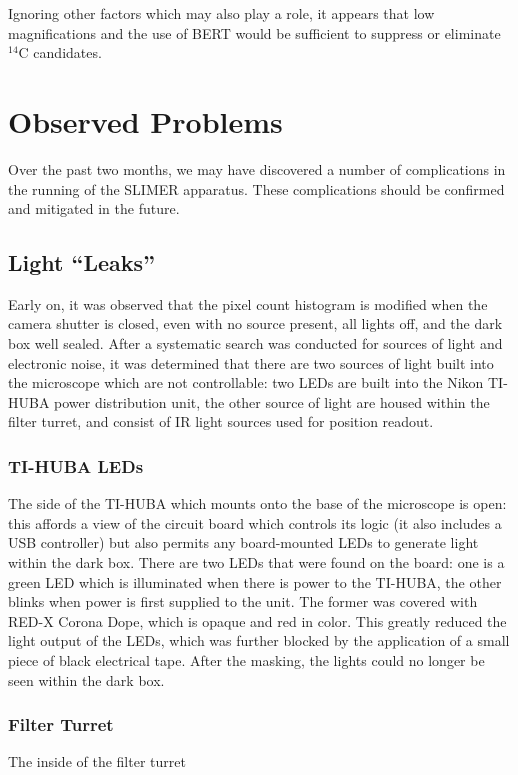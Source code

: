 \documentclass[11pt]{article}
\newcommand{\nuc}[2]{\ensuremath{^{#1}}#2}
\begin{document}
Ignoring other factors which may also play a role, it appears that low magnifications and the use of BERT would be sufficient to suppress or eliminate \nuc{14}{C} candidates.    


      
 
  
\section{Observed Problems}
Over the past two months, we may have discovered a number of complications in the running of the SLIMER apparatus. These complications should be confirmed and mitigated in the future.

\subsection{Light ``Leaks''}
Early on, it was observed that the pixel count histogram is modified when the camera shutter is closed, even with no source present, all lights off, and the dark box well sealed. After a systematic 
search was conducted for sources of light and electronic noise, it was determined that there are two sources of light built into the microscope which are not controllable: two LEDs are built into the Nikon TI-HUBA power distribution unit, the other source of light are housed within the filter turret, and consist of IR light sources used for position readout. 

\subsubsection{TI-HUBA LEDs}
The side of the TI-HUBA which mounts onto the base of the microscope is open: this affords a view of the circuit board which controls its logic (it also includes a USB controller) but also permits any board-mounted LEDs to generate light within the dark box. There are two LEDs that were found on the board: one is a green LED which is illuminated when there is power to the TI-HUBA, the other blinks when power is first supplied to the unit. The former was covered with RED-X Corona Dope, which is opaque and red in color. This greatly reduced the light output of the LEDs, which was further blocked by the application of a small piece of black electrical tape.  After the masking, the lights could no longer be seen within the dark box. 

\subsubsection{Filter Turret}
The inside of the filter turret 	
\end{document}
